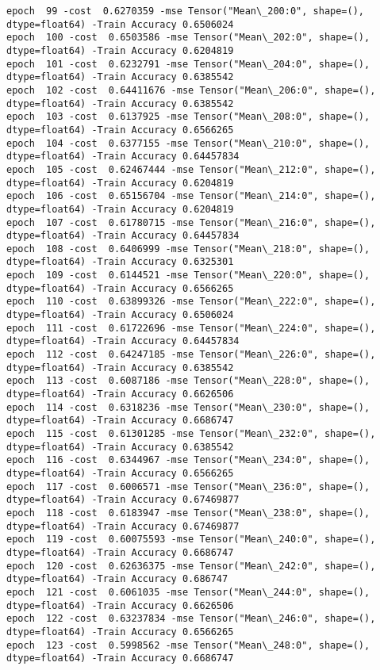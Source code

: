 \documentclass[11pt]{article}
\begin{document}
\begin{Verbatim}[commandchars=\\\{\}]
epoch  99 -cost  0.6270359 -mse Tensor("Mean\_200:0", shape=(), dtype=float64) -Train Accuracy 0.6506024
epoch  100 -cost  0.6503586 -mse Tensor("Mean\_202:0", shape=(), dtype=float64) -Train Accuracy 0.6204819
epoch  101 -cost  0.6232791 -mse Tensor("Mean\_204:0", shape=(), dtype=float64) -Train Accuracy 0.6385542
epoch  102 -cost  0.64411676 -mse Tensor("Mean\_206:0", shape=(), dtype=float64) -Train Accuracy 0.6385542
epoch  103 -cost  0.6137925 -mse Tensor("Mean\_208:0", shape=(), dtype=float64) -Train Accuracy 0.6566265
epoch  104 -cost  0.6377155 -mse Tensor("Mean\_210:0", shape=(), dtype=float64) -Train Accuracy 0.64457834
epoch  105 -cost  0.62467444 -mse Tensor("Mean\_212:0", shape=(), dtype=float64) -Train Accuracy 0.6204819
epoch  106 -cost  0.65156704 -mse Tensor("Mean\_214:0", shape=(), dtype=float64) -Train Accuracy 0.6204819
epoch  107 -cost  0.61780715 -mse Tensor("Mean\_216:0", shape=(), dtype=float64) -Train Accuracy 0.64457834
epoch  108 -cost  0.6406999 -mse Tensor("Mean\_218:0", shape=(), dtype=float64) -Train Accuracy 0.6325301
epoch  109 -cost  0.6144521 -mse Tensor("Mean\_220:0", shape=(), dtype=float64) -Train Accuracy 0.6566265
epoch  110 -cost  0.63899326 -mse Tensor("Mean\_222:0", shape=(), dtype=float64) -Train Accuracy 0.6506024
epoch  111 -cost  0.61722696 -mse Tensor("Mean\_224:0", shape=(), dtype=float64) -Train Accuracy 0.64457834
epoch  112 -cost  0.64247185 -mse Tensor("Mean\_226:0", shape=(), dtype=float64) -Train Accuracy 0.6385542
epoch  113 -cost  0.6087186 -mse Tensor("Mean\_228:0", shape=(), dtype=float64) -Train Accuracy 0.6626506
epoch  114 -cost  0.6318236 -mse Tensor("Mean\_230:0", shape=(), dtype=float64) -Train Accuracy 0.6686747
epoch  115 -cost  0.61301285 -mse Tensor("Mean\_232:0", shape=(), dtype=float64) -Train Accuracy 0.6385542
epoch  116 -cost  0.6344967 -mse Tensor("Mean\_234:0", shape=(), dtype=float64) -Train Accuracy 0.6566265
epoch  117 -cost  0.6006571 -mse Tensor("Mean\_236:0", shape=(), dtype=float64) -Train Accuracy 0.67469877
epoch  118 -cost  0.6183947 -mse Tensor("Mean\_238:0", shape=(), dtype=float64) -Train Accuracy 0.67469877
epoch  119 -cost  0.60075593 -mse Tensor("Mean\_240:0", shape=(), dtype=float64) -Train Accuracy 0.6686747
epoch  120 -cost  0.62636375 -mse Tensor("Mean\_242:0", shape=(), dtype=float64) -Train Accuracy 0.686747
epoch  121 -cost  0.6061035 -mse Tensor("Mean\_244:0", shape=(), dtype=float64) -Train Accuracy 0.6626506
epoch  122 -cost  0.63237834 -mse Tensor("Mean\_246:0", shape=(), dtype=float64) -Train Accuracy 0.6566265
epoch  123 -cost  0.5998562 -mse Tensor("Mean\_248:0", shape=(), dtype=float64) -Train Accuracy 0.6686747

\end{Verbatim}
\end{document}
